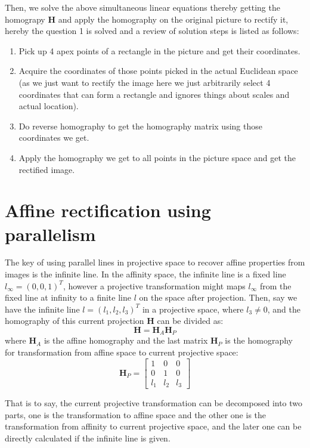 \documentclass[conference]{IEEEtran}
\newcommand{\mat}[1]{\mathbf{#1}} %
\begin{document}
\noindent Then, we solve the above simultaneous linear equations thereby getting the homograpy $\mat{H}$ and apply the homography on the original picture to rectify it, hereby the question 1 is solved and a review of solution steps is listed as follows:
\begin{enumerate}
	\item Pick up 4 apex points of a rectangle in the picture and get their coordinates.
	\item Acquire the coordinates of those points picked in the actual Euclidean space (as we just want to rectify the image here we just arbitrarily select 4 coordinates that can form a rectangle and ignores things about scales and actual location).
	\item Do reverse homography to get the homography matrix using those coordinates we get.
	\item Apply the homography we get to all points in the picture space and get the rectified image.
\end{enumerate}


\section{Affine rectification using parallelism}
The key of using parallel lines in projective space to recover affine properties from images is the infinite line. In the affinity space, the infinite line is a fixed line $l_{\infty} = (0, 0, 1)^T$, however a projective transformation might maps $l_{\infty}$ from the fixed line at infinity to a finite line $l$ on the space after projection. Then, say we have the infinite line $l = (l_1, l_2, l_3)^T$ in a projective space, where $l_3\neq 0$, and the homography of this current projection $\mat{H}$ can be divided as:
\begin{equation}
	\mat{H}=\mat{H}_A\mat{H}_P
\end{equation}
\noindent where $\mat{H}_A$ is the affine homography and the last matrix $\mat{H}_P$ is the homography for transformation from affine space to current projective space:
\begin{equation}
	\mat{H}_P = 
	\begin{bmatrix}
		1 & 0 & 0 \\
		0 & 1 & 0 \\
		l_1 &  l_2 & l_3
	\end{bmatrix}
\end{equation}

\noindent That is to say, the current projective transformation can be decomposed into two parts, one is the transformation to affine space and the other one is the transformation from affinity to current projective space, and the later one can be directly calculated if the infinite line is given.
\end{document}
